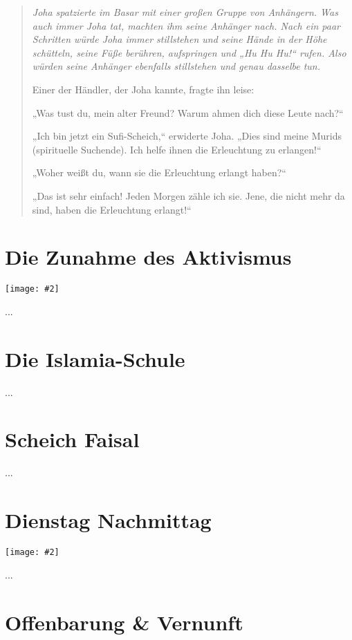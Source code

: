 \documentclass[12pt]{memoir}
\newcommand{\img}[3]{\begin{center}%
\texttt{[image: \#2]}\\{\small\em#3}%
\end{center}}
\begin{document}
\begin{quote}
\itshape
Joha spatzierte im Basar mit einer großen Gruppe von Anhängern.
Was auch immer Joha tat, machten ihm seine Anhänger nach.
Nach ein paar Schritten würde Joha immer stillstehen
und seine Hände in der Höhe schütteln,
seine Füße berühren, aufspringen und „Hu Hu Hu!“ rufen.
Also würden seine Anhänger ebenfalls stillstehen
und genau dasselbe tun.

Einer der Händler, der Joha kannte, fragte ihn leise:

„Was tust du, mein alter Freund?
Warum ahmen dich diese Leute nach?“

„Ich bin jetzt ein Sufi-Scheich,“ erwiderte Joha.
„Dies sind meine Murids (spirituelle Suchende).
Ich helfe ihnen die Erleuchtung zu erlangen!“

„Woher weißt du, wann sie die Erleuchtung erlangt haben?“

„Das ist sehr einfach! Jeden Morgen zähle ich sie.
Jene, die nicht mehr da sind, haben die Erleuchtung erlangt!“
\end{quote}


\chapter{Die Zunahme des Aktivismus}

\img{scale=0.7}{Assassination_of_Sadat.jpg}{}

...

\chapter{Die Islamia-Schule}

...

\chapter{Scheich Faisal}

...

\chapter{Dienstag Nachmittag}

\img{scale=0.4}{911_Second_Plane.jpg}{}

...


\chapter{Offenbarung \& Vernunft}
\end{document}
